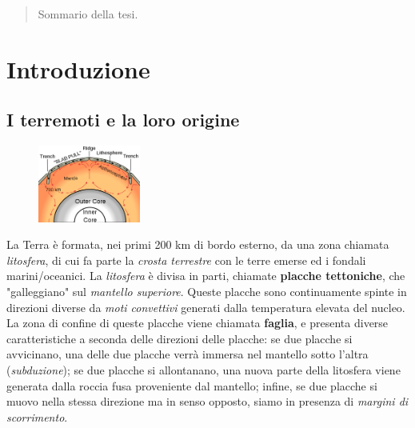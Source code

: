 \documentclass[a4paper,10pt]{memoir}
\begin{document}
  
  
\frontmatter


\maketitle
\cleardoublepage

\begin{abstract}
	\thispagestyle{plain}
	Sommario della tesi.
\end{abstract}
\cleardoublepage

\tableofcontents
\cleardoublepage

\mainmatter

\renewcommand\chapterheadstart{}
\renewcommand\printchaptername{}
\renewcommand\chapternamenum{}
\renewcommand\printchapternum{}
\renewcommand\afterchapternum{}
\renewcommand\printchaptertitle[1]{\chaptitlefont \thechapter. \space #1}


\chapter{Introduzione}

\section{I terremoti e la loro origine}


\begin{figure}
\label{fig:litosfera}
\includegraphics[width=0.30\textwidth]{introduzione/oceanic_spreading}
\end{figure}

La Terra è formata, nei primi 200 km di bordo esterno, da una zona chiamata \textit{litosfera}, di cui fa parte la \textit{crosta terrestre} con le terre emerse ed i fondali marini/oceanici. La \textit{litosfera} è divisa in parti, chiamate \textbf{placche tettoniche}, che "galleggiano" sul \textit{mantello superiore}. Queste placche sono continuamente spinte in direzioni diverse da \textit{moti convettivi} generati dalla temperatura elevata del nucleo. La zona di confine di queste placche viene chiamata \textbf{faglia}, e presenta diverse caratteristiche a seconda delle direzioni delle placche: se due placche si avvicinano, una delle due placche verrà immersa nel mantello sotto l'altra (\textit{subduzione}); se due placche si allontanano, una nuova parte della litosfera viene generata dalla roccia fusa proveniente dal mantello; infine, se due placche si muovo nella stessa direzione ma in senso opposto, siamo in presenza di \textit{margini di scorrimento}.
\end{document}
